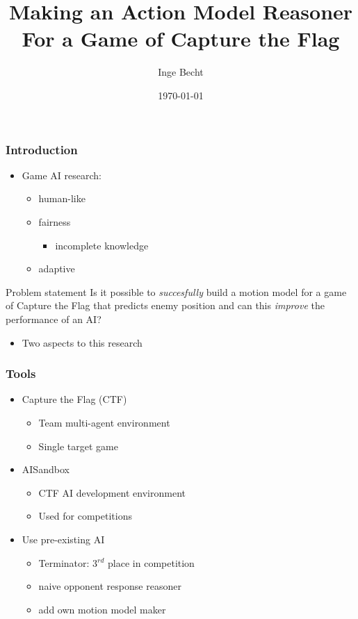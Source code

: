 \documentclass{beamer}
\title[Action Model Reasoner]{Making an Action Model Reasoner
    For a Game of Capture
the Flag}
\author{Inge Becht}
\institute[University of Amsterdam]
{
University of Amsterdam \\
\medskip
{}
}
\date{\today}
\begin{document}
%
\begin{frame}
    \titlepage
\end{frame}

\begin{frame}
    \frametitle{Introduction}
    \begin{itemize}
        \item{Game AI research:}
            \begin{itemize}
                \item human-like
                \item {\color{red}fairness}
                    \begin{itemize}
                        \item incomplete knowledge
                    \end{itemize}
                \item adaptive
            \end{itemize}
    \end{itemize}
    \begin{block}{Problem statement}
        Is it possible to \emph{succesfully} build a motion model for a game of Capture the Flag that predicts enemy
        position and can this \emph{improve} the performance of an AI?
    \end{block}
\begin{itemize}
    \item Two aspects to this research
\end{itemize}
\end{frame}

\begin{frame}
    \frametitle{Tools}
    \begin{itemize}
        \item{Capture the Flag (CTF)}
            \begin{itemize}
                \item Team multi-agent environment
                \item Single target game
            \end{itemize}
        \item{AISandbox}
            \begin{itemize}
                \item CTF AI development environment
                \item Used for competitions
            \end{itemize}
        \item{Use pre-existing AI}
            \begin{itemize}
                \item Terminator: 3$^{rd}$ place in competition
                \item naive opponent response reasoner
                \item add own motion model maker
            \end{itemize}
    \end{itemize}
\end{frame}
\end{document}

